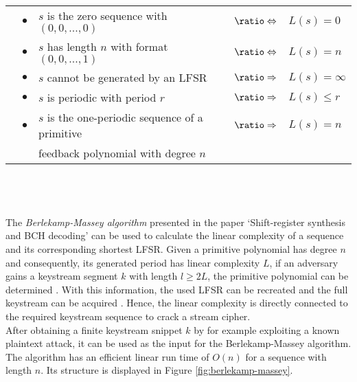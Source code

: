 \bgroup
\def\arraystretch{1.2}
\begin{tabular}{lllll}
	&$\bullet$&$s$ is the zero sequence with $(0, 0, ..., 0)$ & $\logeq$ & $L(s)=0$ \\
	&$\bullet$& $s$ has length $n$ with format $(0, 0, ..., 1)$ & $\logeq$ & $L(s) = n$\\
	&$\bullet$& $s$ cannot be generated by an LFSR  & $\logright$ & $ L(s) = \infty$\\
	&$\bullet$&  $s$ is periodic with period $r$ & $\logright$ & $L(s) \leq  r$\\
	&$\bullet$& $s$ is the one-periodic sequence of a primitive  & $\logright$ & $L(s) = n$ \\
	&&feedback polynomial with degree $n$&& \\
\end{tabular}
\egroup
\\\\\\
The \emph{Berlekamp-Massey algorithm} presented in the paper ‘Shift-register synthesis and BCH decoding’ can be used to calculate the linear complexity of a sequence and its corresponding shortest LFSR. Given a primitive polynomial has degree $n$ and consequently, its generated period has linear complexity $L$, if an adversary gains a keystream segment $k$ with length $l \geq 2L$, the primitive polynomial can be determined \cite[pp. 124-125]{Massey.1969}. With this information, the used LFSR can be recreated and the full keystream can be acquired \cite[p. 232]{Smart.2016}. Hence, the linear complexity is directly connected to the required keystream sequence to crack a stream cipher. \\

After obtaining a finite keystream snippet $k$ by for example exploiting a known plaintext attack, it can be used as the input for the Berlekamp-Massey algorithm. The algorithm has an efficient linear run time of $O(n)$ for a sequence with length $n$. Its structure is displayed in Figure \ref{fig:berlekamp-massey}.  \\

